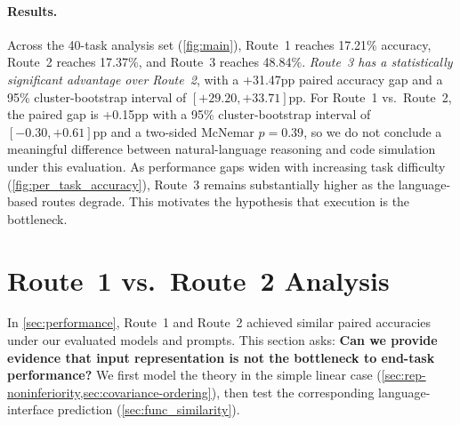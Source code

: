 
\paragraph{Results.}
Across the 40-task analysis set (\cref{fig:main}), Route~1 reaches
17.21\% accuracy, Route~2 reaches 17.37\%, and Route~3 reaches 48.84\%.
\emph{Route~3 has a statistically significant advantage over Route~2},
with a +31.47pp paired accuracy gap and a 95\% cluster-bootstrap interval
of $[+29.20,+33.71]$pp. For Route~1 vs.\ Route~2, the paired gap is
+0.15pp with a 95\% cluster-bootstrap interval of $[-0.30,+0.61]$pp
and a two-sided McNemar $p=0.39$, so we do not conclude a meaningful
difference between natural-language reasoning and code simulation under
this evaluation. As performance gaps widen with increasing task difficulty
(\cref{fig:per_task_accuracy}), Route~3 remains substantially higher as
the language-based routes degrade. This motivates the hypothesis that execution is the bottleneck.



\section{Route~1 vs.\ Route~2 Analysis}
\label{sec:rep_analysis}
In \cref{sec:performance}, Route~1 and Route~2 achieved similar paired accuracies under our evaluated models and prompts. This section asks: \textbf{Can we provide evidence that input representation is not the bottleneck to end-task performance?} We first model the theory in the simple linear case (\cref{sec:rep-noninferiority,sec:covariance-ordering}), then test the corresponding language-interface prediction (\cref{sec:func_similarity}).

